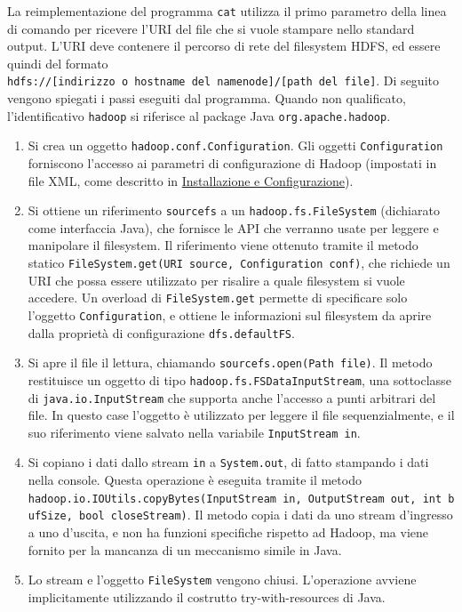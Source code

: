\documentclass[italian,a4paper, twoside, 12pt]{report}
\begin{document}
La reimplementazione del programma \texttt{cat} utilizza il primo
parametro della linea di comando per ricevere l'URI del file che si
vuole stampare nello standard output. L'URI deve contenere il percorso
di rete del filesystem HDFS, ed essere quindi del formato
\texttt{hdfs://{[}indirizzo\ o\ hostname\ del\ namenode{]}/{[}path\ del\ file{]}}.
Di seguito vengono spiegati i passi eseguiti dal programma. Quando non
qualificato, l'identificativo \texttt{hadoop} si riferisce al package
Java \texttt{org.apache.hadoop}.

\begin{enumerate}
\item
  Si crea un oggetto \texttt{hadoop.conf.Configuration}. Gli oggetti
  \texttt{Configuration} forniscono l'accesso ai parametri di
  configurazione di Hadoop (impostati in file XML, come descritto in
  \protect\hyperlink{installazione-e-configurazione}{Installazione e
  Configurazione}).
\item
  Si ottiene un riferimento \texttt{sourcefs} a un
  \texttt{hadoop.fs.FileSystem} (dichiarato come interfaccia Java), che
  fornisce le API che verranno usate per leggere e manipolare il
  filesystem. Il riferimento viene ottenuto tramite il metodo statico
  \texttt{FileSystem.get(URI\ source,\ Configuration\ conf)}, che
  richiede un URI che possa essere utilizzato per risalire a quale
  filesystem si vuole accedere. Un overload di \texttt{FileSystem.get}
  permette di specificare solo l'oggetto \texttt{Configuration}, e
  ottiene le informazioni sul filesystem da aprire dalla proprietà di
  configurazione \texttt{dfs.defaultFS}.
\item
  Si apre il file il lettura, chiamando
  \texttt{sourcefs.open(Path\ file)}. Il metodo restituisce un oggetto
  di tipo \texttt{hadoop.fs.FSDataInputStream}, una sottoclasse di
  \texttt{java.io.InputStream} che supporta anche l'accesso a punti
  arbitrari del file. In questo case l'oggetto è utilizzato per leggere
  il file sequenzialmente, e il suo riferimento viene salvato nella
  variabile \texttt{InputStream\ in}.
\item
  Si copiano i dati dallo stream \texttt{in} a \texttt{System.out}, di
  fatto stampando i dati nella console. Questa operazione è eseguita
  tramite il metodo
  \texttt{hadoop.io.IOUtils.copyBytes(InputStream\ in,\ OutputStream\ out,\ int\ bufSize,\ bool\ closeStream)}.
  Il metodo copia i dati da uno stream d'ingresso a uno d'uscita, e non
  ha funzioni specifiche rispetto ad Hadoop, ma viene fornito per la
  mancanza di un meccanismo simile in Java.
\item
  Lo stream e l'oggetto \texttt{FileSystem} vengono chiusi. L'operazione
  avviene implicitamente utilizzando il costrutto try-with-resources di
  Java.
\end{enumerate}
\end{document}
